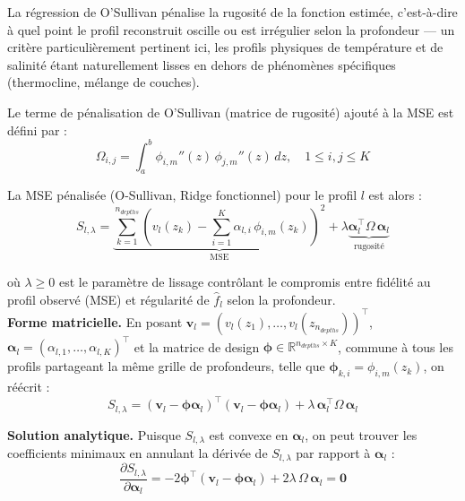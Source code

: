 \documentclass{article}
\begin{document}
	La régression de O'Sullivan pénalise la rugosité de la fonction estimée, c'est-à-dire à quel point le profil reconstruit oscille ou est irrégulier selon la profondeur — un critère particulièrement pertinent ici, les profils physiques de température et de salinité étant naturellement lisses en dehors de phénomènes spécifiques (thermocline, mélange de couches).
	
	Le terme de pénalisation de O'Sullivan (matrice de rugosité) ajouté à la MSE est défini par :
	\begin{equation}
		\Omega_{i,j} = \int_{a}^{b} \phi_{i,m}''(z)\, \phi_{j,m}''(z)\, dz, 
		\quad 1 \leq i, j \leq K
	\end{equation}
	
	La MSE pénalisée (O-Sullivan, Ridge fonctionnel) pour le profil $l$ est alors :
	\begin{equation}
		S_{l,\lambda} = \underbrace{\sum_{k=1}^{n_{depths}} \left(v_l(z_k) - \sum_{i=1}^{K} 
			\alpha_{l,i}\, \phi_{i,m}(z_k)\right)^{2}}_{\text{MSE}} 
		+ \lambda \underbrace{\boldsymbol{\alpha}_l^\top \Omega\, 
			\boldsymbol{\alpha}_l}_{\text{rugosité}}
	\end{equation}
	
	où $\lambda \geq 0$ est le paramètre de lissage contrôlant le compromis entre 
	fidélité au profil observé (MSE) et régularité de $\hat f_l$ selon la profondeur.\\
	
	\textbf{Forme matricielle.} En posant $\mathbf{v}_l = (v_l(z_1), \ldots, v_l(z_{n_{depths}}))^\top$, 
	$\boldsymbol{\alpha}_l = (\alpha_{l,1}, \ldots, \alpha_{l,K})^\top$ et la matrice de design 
	$\mathbf{\phi} \in \mathbb{R}^{n_{depths} \times K}$, commune à tous les profils partageant la même grille de profondeurs, telle que $\mathbf{\phi}_{k,i} = \phi_{i, m}(z_k)$, 
	on réécrit :
	\begin{equation}
		S_{l,\lambda} = \left(\mathbf{v}_l - \mathbf{\phi}\boldsymbol{\alpha}_l\right)^\top 
		\left(\mathbf{v}_l - \mathbf{\phi}\boldsymbol{\alpha}_l\right) 
		+ \lambda\, \boldsymbol{\alpha}_l^\top \Omega\, \boldsymbol{\alpha}_l
	\end{equation}
	
	\textbf{Solution analytique.} Puisque $S_{l,\lambda}$ est convexe en $\boldsymbol{\alpha}_l$, on peut trouver les coefficients minimaux en annulant la dérivée de $S_{l,\lambda}$ par rapport à 
	$\boldsymbol{\alpha}_l$ :
	\begin{equation}
		\frac{\partial S_{l,\lambda}}{\partial \boldsymbol{\alpha}_l} = 
		-2\mathbf{\phi}^\top(\mathbf{v}_l - \mathbf{\phi}\boldsymbol{\alpha}_l) 
		+ 2\lambda\, \Omega\, \boldsymbol{\alpha}_l = \mathbf{0}
	\end{equation}
	
\end{document}
